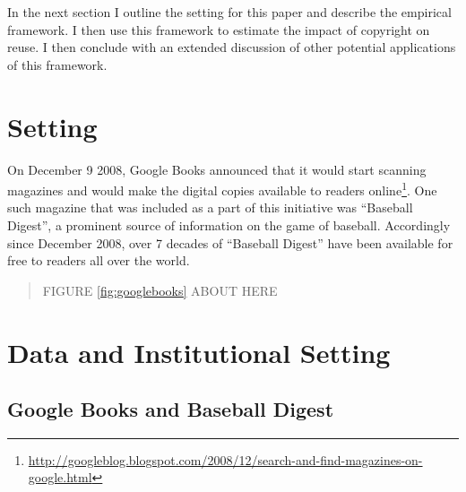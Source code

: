 \documentclass[12pt]{article}
\begin{document}
In the next section I outline the setting for this paper and describe the empirical framework. I then use this framework to estimate the impact of copyright on reuse. I then conclude with an extended discussion of other potential applications of this framework.

\section{Setting}

On December 9 2008, Google Books announced that it would start scanning magazines and would make the digital copies available to readers online\footnote{\href{http://googleblog.blogspot.com/2008/12/search-and-find-magazines-on-google.html}{http://googleblog.blogspot.com/2008/12/search-and-find-magazines-on-google.html}}. One such magazine that was included as a part of this initiative was ``Baseball Digest'', a prominent source of information on the game of baseball. Accordingly since December 2008, over 7 decades of ``Baseball Digest'' have been available for free to readers all over the world.

\begin{quote}
\centering
FIGURE \ref{fig:googlebooks} ABOUT HERE
\end{quote}
 









\newpage

\section{Data and Institutional Setting}

\subsection{Google Books and Baseball Digest}
\end{document}
